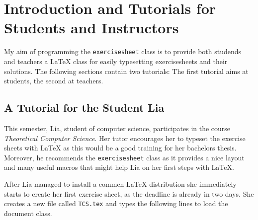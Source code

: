 \documentclass{report}
\def\exercisesheet{\texttt{exercisesheet}}
\begin{document}

\begin{abstract}
  The \exercisesheet{} class provides a convenient way to produce
  hiqh-quality exercise sheets for both students and instructors. This
  is the official reference manual. It contains tutorials for students
  and instructors that explain the first steps in using this class.
  Moreover, a complete list of the commands defined by the
  \exercisesheet{} class is contained.
\end{abstract}

\tableofcontents

\chapter{Introduction and Tutorials for Students and Instructors}

My aim of programming the \exercisesheet{} class is to provide both
studends and teachers a \LaTeX{} class for easily typesetting
exercisesheets and their solutions. The following sections contain two
tutorials: The first tutorial aims at students, the second at
teachers.

\section{A Tutorial for the Student Lia}

This semester, Lia, student of computer science, participates in the
course \emph{Theoretical Computer Science}. Her tutor encourages her
to typeset the exercise sheets with \LaTeX{} as this would be a good
training for her bachelors thesis. Moreover, he recommends the
\exercisesheet{} class as it provides a nice layout and many useful
macros that might help Lia on her first steps with \LaTeX{}.

After Lia managed to install a commen \LaTeX{} distribution she
immediately starts to create her first exercise sheet, as the deadline
is already in two days. She creates a new file called
\lstinline{TCS.tex} and types the following lines to load the document
class.
\end{document}
